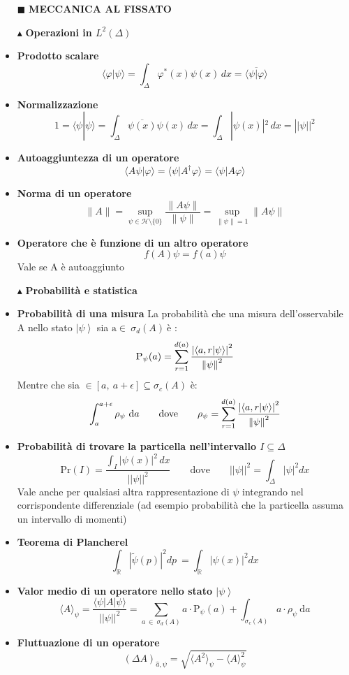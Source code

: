 \documentclass{book}
\newcommand{\g}{\textbf}
\newcommand{\e}{\begin{equation}}
\newcommand{\ex}{\end{equation} }
\renewcommand{\it}{\item[$\cdot$]}
\begin{document}
\begin{multicols}{4}

\begin{itemize}
\item [$\blacksquare$] \g{MECCANICA AL FISSATO}
\item [$\blacktriangle$] \g{Operazioni in $L^2(\Delta)$}
    \it \g{Prodotto scalare}
        \e{\langle \varphi | \psi \rangle = \int_{\Delta} \varphi^*(x) \psi(x) \, dx = \overline{\langle \psi | \varphi \rangle}} \ex
    \it \g{Normalizzazione }
        \e{1 = \langle \psi | \psi \rangle = \int_{\Delta} \overline{\psi(x)}\psi(x) \, dx = \int_{\Delta} |\psi(x)|^2 \, dx = ||\psi||^{2}}     \ex
    \it \g{Autoaggiuntezza di un operatore}
        \e{\langle A\psi | \varphi \rangle = \langle \psi | A^\dagger \varphi \rangle = \langle \psi | A \varphi \rangle} \ex
    \it \g{Norma di un operatore}
        \e{\|A\| = \sup_{\psi \in \mathcal{H} \setminus \{0\}} \frac{\|A\psi\|}{\|\psi\|} = \sup_{\|\psi\|=1} \|A\psi\|} \ex
    \it \g{Operatore che è funzione di un altro operatore}
        \e{f(A)\psi = f(a)\psi}\ex
        Vale se A è autoaggiunto
    \item [$\blacktriangle$] \g{Probabilità e statistica}
    \it \g{Probabilità di una misura}
    La probabilità che una misura dell'osservabile A nello stato $\left|\psi\right>$ sia $\text{a} \in \ \sigma_{d}(A) \  \text{è}  $ :
            \e{ {\text{P}_{\psi}(a)} = \sum_{r=1}^{d(a)}\frac{\left| \braket{a,r}{\psi} \right|^{2}}{\norm{\psi}^{2}}} \ex
       Mentre che sia $\in [a, \ a + \epsilon] \subseteq \sigma_{c}(A)$ è:    
\e{\int_{a}^{a+\epsilon}\rho_{\psi}\ \text{d}a \qquad  \text{dove} \qquad \rho_{\psi} = \sum_{r=1}^{d(a)}\frac{\left| \braket{a,r}{\psi} \right|^{2}}{\norm{\psi}^{2}}}\ex

\it \g{Probabilità di trovare la particella nell'intervallo $I \subseteq \Delta$}
        \e{\mathrm{Pr}(I) = \frac{\int_I |\psi(x)|^2\, dx}{||\psi||^{2}} \qquad \text{dove} \qquad ||\psi||^{2} =\int_{\Delta}|\psi|^{2}dx } \ex
Vale anche per qualsiasi altra rappresentazione di $\psi$ integrando nel corrispondente differenziale (ad esempio probabilità che la particella assuma un intervallo di momenti)

    \it \g{Teorema di Plancherel}
\e{\int_{\mathbb{R}}|\tilde{\psi}(p)|^{2}dp \   = \int_{\mathbb{R}}|\psi(x)|^{2}dx }\ex

        \it \g{Valor medio di un operatore nello stato $\left|\psi\right>$}
            \e{\langle A \rangle_{\psi}   =  \frac{\langle \psi | A | \psi \rangle}{||\psi||^{2}} = \sum_{a \ \in \ \sigma_{d}(A)}a \cdot \text{P}_{\psi}(a) + \int_{\sigma_{c}(A)} a \cdot \rho_{\psi}\ \text{d}a} \ex
        \it \g{Fluttuazione di un operatore}
        \e{(\Delta A)_{\hat{a}, \psi} = \sqrt{ \langle A^2 \rangle_\psi - \langle A \rangle_\psi^2}} \ex
        

\end{itemize}
\end{multicols}
\end{document}
